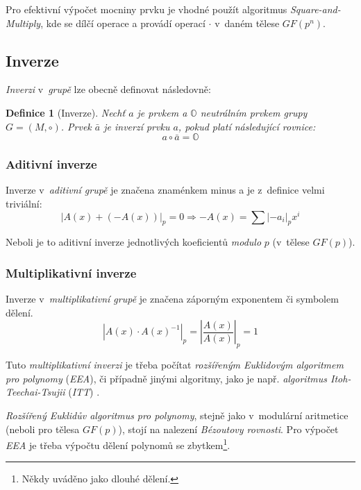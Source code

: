 \documentclass[thesis=M,czech,hidelinks]{FITthesis}[2012/06/26]
\newcommand{\0}{{\textcolor[gray]{0.100}{0}}}
\newtheorem{definice}{Definice}
\begin{document}
Pro efektivní výpočet mocniny prvku je vhodné použít algoritmus
\emph{Square-and-Multiply}, kde se dílčí operace  a 
provádí operací $\cdot$ v~daném tělese $GF(p^n)$.

\subsection{Inverze}
\emph{Inverzi} v~\emph{grupě} lze obecně definovat následovně:
\begin{definice}[Inverze]
    Nechť $a$ je prvkem a $\mathbb{O}$ neutrálním prvkem \emph{grupy} \\
    $G = (M,\circ)$. Prvek $\bar{a}$ je \emph{inverzí} prvku $a$, pokud
    platí následující rovnice:
    $$ a \circ \bar{a} = \mathbb{O} $$
\end{definice}

\subsubsection{Aditivní inverze}
Inverze v~\emph{aditivní grupě} je značena znaménkem minus \uv{$-$} a je
z~definice velmi triviální:
$$ \left| A(x) + (-A(x)) \right|_p = 0 \Rightarrow
-A(x) = \sum \left|-a_i\right|_p x^i $$

Neboli je to aditivní inverze jednotlivých koeficientů \emph{modulo} $p$
(v~tělese $GF(p)$).


\subsubsection{Multiplikativní inverze}
Inverze v~\emph{multiplikativní grupě} je značena záporným exponentem
 či symbolem dělení.
$$ \left| A(x) \cdot A(x)^{-1} \right|_p =
\left| \frac{A(x)}{A(x)} \right|_p = 1 $$

Tuto \emph{multiplikativní inverzi} je třeba počítat \emph{rozšířeným Euklidovým
algoritmem pro polynomy} (\emph{EEA}), či případně jinými algoritmy, jako je např.
\emph{algoritmus Itoh-Teechai-Tsujii} (\emph{ITT}) \cite{FIT_BHW,ITT}.

\emph{Rozšířený Euklidův algoritmus} \emph{pro polynomy}, stejně jako v~modulární
aritmetice (neboli pro tělesa $GF(p)$), stojí na nalezení \emph{Bézoutovy
rovnosti}. Pro výpočet \emph{EEA} je třeba výpočtu dělení polynomů se
zbytkem\footnote{
Někdy uváděno jako dlouhé dělení.
}.

\end{document}
